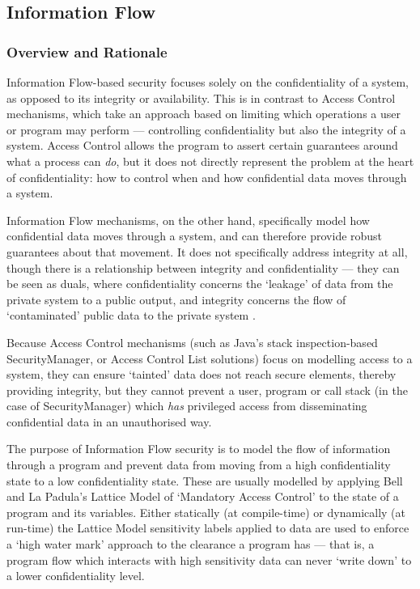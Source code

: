\subsection{Information Flow}

\subsubsection{Overview and Rationale}

Information Flow-based security focuses solely on the confidentiality of a system, as opposed to its integrity or availability. This is in contrast to Access Control mechanisms, which take an approach based on limiting which operations a user or program may perform --- controlling confidentiality but also the integrity of a system. Access Control allows the program to assert certain guarantees around what a process can \textit{do}, but it does not directly represent the problem at the heart of confidentiality: how to control when and how confidential data moves through a system.

Information Flow mechanisms, on the other hand, specifically model how confidential data moves through a system, and can therefore provide robust guarantees about that movement. It does not specifically address integrity at all, though there is a relationship between integrity and confidentiality --- they can be seen as duals, where confidentiality concerns the `leakage' of data from the private system to a public output, and integrity concerns the flow of `contaminated' public data to the private system \cite{biba1977integrity} \cite{clarkson2010confintegrity}.

Because Access Control mechanisms (such as Java's stack inspection-based SecurityManager, or Access Control List solutions) focus on modelling access to a system, they can ensure `tainted' data does not reach secure elements, thereby providing integrity, but they cannot prevent a user, program or call stack (in the case of SecurityManager) which \textit{has} privileged access from disseminating confidential data in an unauthorised way.

The purpose of Information Flow security is to model the flow of information through a program and prevent data from moving from a high confidentiality state to a low confidentiality state. These are usually modelled by applying Bell and La Padula's Lattice Model \cite{bell1976lattice} of `Mandatory Access Control' to the state of a program and its variables. Either statically (at compile-time) or dynamically (at run-time) the Lattice Model sensitivity labels applied to data are used to enforce a `high water mark' \cite{ausanka2001accesscontrol} approach to the clearance a program has --- that is, a program flow which interacts with high sensitivity data can never `write down' to a lower confidentiality level.

